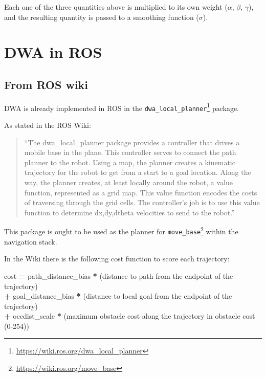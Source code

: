 \documentclass[11pt,a4paper]{article}
\begin{document}
Each one of the three quantities above is multiplied to its own weight ($\alpha$, $\beta$, $\gamma$), and the resulting quantity is passed to a smoothing function ($\sigma$).



\section{DWA in ROS}

\subsection{From ROS wiki}

DWA is already implemented in ROS in the \texttt{dwa\_local\_planner}\footnote{\href{https://wiki.ros.org/dwa\_local\_planner}{https://wiki.ros.org/dwa\_local\_planner}} package.

As stated in the ROS Wiki:
\begin{quote}
 ``The dwa\_local\_planner package provides a controller that drives a mobile base in the plane. This controller serves to connect the path planner to the robot. Using a map, the planner creates a kinematic trajectory for the robot to get from a start to a goal location. Along the way, the planner creates, at least locally around the robot, a value function, represented as a grid map. This value function encodes the costs of traversing through the grid cells. The controller's job is to use this value function to determine dx,dy,dtheta velocities to send to the robot.''
\end{quote}

This package is ought to be used as the planner for \texttt{move\_base}\footnote{\href{https://wiki.ros.org/move\_base}{https://wiki.ros.org/move\_base}} within the navigation stack.

In the Wiki there is the following cost function to score each trajectory:


\begin{tcolorbox}[enhanced,width=6in,center,size=fbox]

cost \textbf{=} path\_distance\_bias \textbf{*} (distance to path from the endpoint of the trajectory)\\
    \hspace*{4em}\textbf{+} goal\_distance\_bias \textbf{*} (distance to local goal from the endpoint of the trajectory)\\
    \hspace*{4em}\textbf{+} occdist\_scale \textbf{*} (maximum obstacle cost along the trajectory in obstacle cost (0-254))

\end{tcolorbox}
\end{document}
